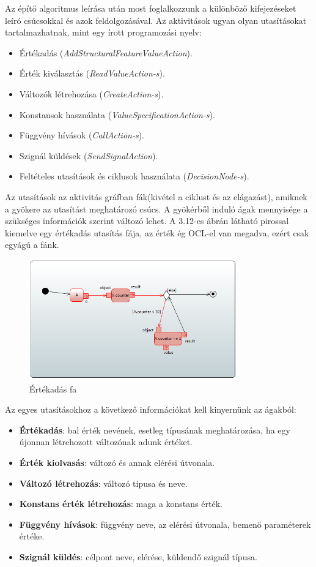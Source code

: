 \documentclass[a4paper,12pt]{report}
\begin{document}
Az építő algoritmus leírása után most foglalkozzunk a különböző kifejezéseket leíró csúcsokkal és azok feldolgozásával. Az aktivitások ugyan olyan utasításokat tartalmazhatnak, mint egy írott programozási nyelv:
\begin{itemize}
\item Értékadás ({\it AddStructuralFeatureValueAction}).
\item Érték kiválasztás ({\it ReadValueAction-s}).
\item Változók létrehozása ({\it CreateAction-s}).
\item Konstansok használata ({\it ValueSpecificationAction-s}).
\item Függvény hívások ({\it CallAction-s}).
\item Szignál küldések ({\it SendSignalAction}).
\item Feltételes utasítások és ciklusok használata ({\it DecisionNode-s}).
\end{itemize}
Az utasítások az aktivitás gráfban fák(kivétel a ciklust és az elágazást), amiknek a gyökere az utasítást meghatározó csúcs. A gyökérből induló ágak mennyisége a szükséges információk szerint változó lehet. A 3.12-es ábrán látható pirossal kiemelve egy értékadás utasítás fája, az érték ég OCL-el van megadva, ezért csak egyágú a fánk.

\begin{figure}[hbtp]
\centering
\includegraphics[width=0.8\textwidth]{utpl.png}
\caption{Értékadás fa}
\label{fig:etdsada}
\end{figure}

Az egyes utasításokhoz a következő információkat kell kinyernünk az ágakból:
\begin{itemize}
\item {\bf Értékadás}: bal érték nevének, esetleg típusának meghatározása, ha egy újonnan létrehozott változónak adunk értéket.
\item {\bf Érték kiolvasás}: változó és annak elérési útvonala.
\item {\bf Változó létrehozás}: változó típusa és neve.
\item {\bf Konstans érték létrehozás}: maga a konstans érték.
\item {\bf Függvény hívások}: függvény neve, az elérési útvonala, bemenő paraméterek értéke.
\item {\bf Szignál küldés}: célpont neve, elérése, küldendő szignál típusa.
\end{itemize}
\end{document}
